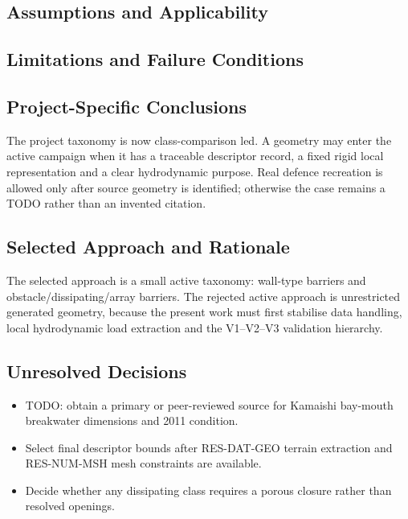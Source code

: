
\subsection{Assumptions and Applicability}
\label{sec:res-geo-tax-assumptions}


\subsection{Limitations and Failure Conditions}
\label{sec:res-geo-tax-limitations}


\subsection{Project-Specific Conclusions}
\label{sec:res-geo-tax-conclusions}

The project taxonomy is now class-comparison led. A geometry may enter
the active campaign when it has a traceable descriptor record, a fixed
rigid local representation and a clear hydrodynamic purpose. Real
defence recreation is allowed only after source geometry is identified;
otherwise the case remains a TODO rather than an invented citation.

\subsection{Selected Approach and Rationale}
\label{sec:res-geo-tax-selected-approach}

The selected approach is a small active taxonomy: wall-type barriers
and obstacle/dissipating/array barriers. The rejected active approach
is unrestricted generated geometry, because the present work must first
stabilise data handling, local hydrodynamic load extraction and the
V1--V2--V3 validation hierarchy.

\subsection{Unresolved Decisions}
\label{sec:res-geo-tax-unresolved-decisions}

\begin{itemize}
  \item TODO: obtain a primary or peer-reviewed source for Kamaishi
    bay-mouth breakwater dimensions and 2011 condition.
  \item Select final descriptor bounds after RES-DAT-GEO terrain
    extraction and RES-NUM-MSH mesh constraints are available.
  \item Decide whether any dissipating class requires a porous closure
    rather than resolved openings.
\end{itemize}

